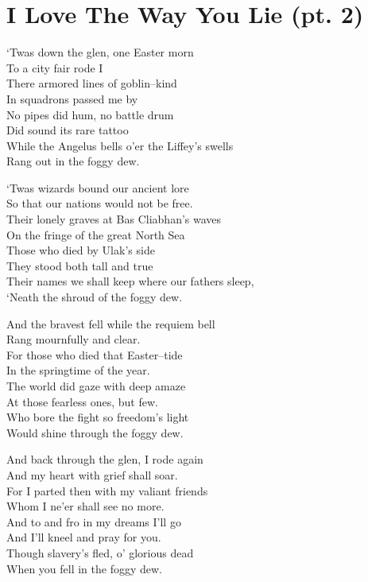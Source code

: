 \chapter{I Love The Way You Lie (pt. 2)}
\begin{quotePoem}{
‘Twas down the glen, one Easter morn\\
To a city fair rode I\\
There armored lines of goblin\mbox{--}kind\\
In squadrons passed me by\\
No pipes did hum, no battle drum\\
Did sound its rare tattoo\\
While the Angelus bells o’er the Liffey’s swells\\
Rang out in the foggy dew.

‘Twas wizards bound our ancient lore\\
So that our nations would not be free.\\
Their lonely graves at Bas Cliabhan’s waves\\
On the fringe of the great North Sea\\
Those who died by Ulak’s side\\
They stood both tall and true\\
Their names we shall keep where our fathers sleep,\\
‘Neath the shroud of the foggy dew.

And the bravest fell while the requiem bell\\
Rang mournfully and clear.\\
For those who died that Easter\mbox{--}tide\\
In the springtime of the year.\\
The world did gaze with deep amaze\\
At those fearless ones, but few.\\
Who bore the fight so freedom’s light\\
Would shine through the foggy dew.

And back through the glen, I rode again\\
And my heart with grief shall soar.\\
For I parted then with my valiant friends\\
Whom I ne’er shall see no more.\\
And to and fro in my dreams I’ll go\\
And I’ll kneel and pray for you.\\
Though slavery’s fled, o’ glorious dead\\
When you fell in the foggy dew.

}
\end{quotePoem}
\simpleline
\SmallVSpace
{}

